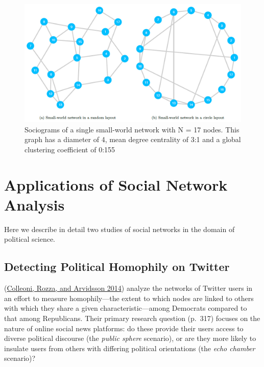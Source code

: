 \documentclass{book}
\begin{document}
\begin{figure}
\centering
\includegraphics{images/social-networks/11-13.png}
\caption{Sociograms of a single small-world network with N = 17 nodes. This
graph has a diameter of 4, mean degree centrality of 3:1 and a global
clustering coefficient of 0:155}
\end{figure}

\hypertarget{applications-of-social-network-analysis}{%
\section{Applications of Social Network
Analysis}\label{applications-of-social-network-analysis}}

Here we describe in detail two studies of social networks in the domain of
political science.

\hypertarget{detecting-political-homophily-on-twitter}{%
\subsection{Detecting Political Homophily on
Twitter}\label{detecting-political-homophily-on-twitter}}

(\protect\hyperlink{ref-ColleoniEtAl2014}{Colleoni, Rozza, and Arvidsson
2014}) analyze the networks of Twitter users in an effort to measure
homophily---the extent to which nodes are linked to others with which they
share a given characteristic---among Democrats compared to that among
Republicans. Their primary research question (p.~317) focuses on the nature of
online social news platforms: do these provide their users access to diverse
political discourse (the \emph{public sphere} scenario), or are they more
likely to insulate users from others with differing political orientations
(the \emph{echo chamber} scenario)?
\end{document}
